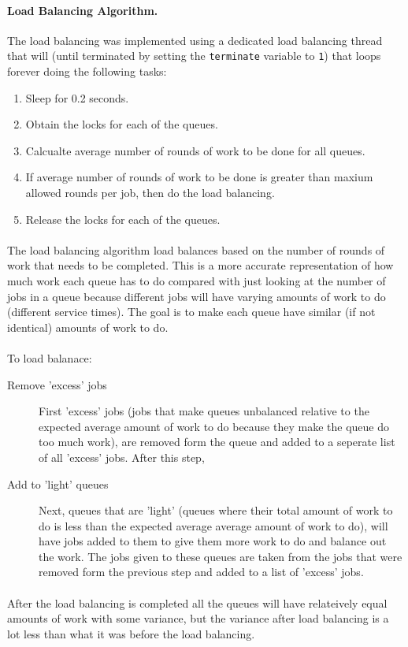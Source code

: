 \documentclass[12pt]{article}
\begin{document}
\paragraph{Load Balancing Algorithm.} The load balancing was implemented using a dedicated load balancing thread that will (until terminated by setting the {\tt terminate} variable to {\tt 1}) that loops forever doing the following tasks:
\begin{enumerate}
  \item Sleep for 0.2 seconds.
  \item Obtain the locks for each of the queues.
  \item Calcualte average number of rounds of work to be done for all queues.
  \item If average number of rounds of work to be done is greater than maxium allowed rounds per job, then do the load balancing.
  \item Release the locks for each of the queues.
\end{enumerate}

\paragraph{} The load balancing algorithm load balances based on the number of rounds of work that needs to be completed. This is a more accurate representation of how much work each queue has to do compared with just looking at the number of jobs in a queue because different jobs will have varying amounts of work to do (different service times). The goal is to make each queue have similar (if not identical) amounts of work to do.

\paragraph{} To load balanace:
\begin{description}
  \item [Remove 'excess' jobs] First 'excess' jobs (jobs that make queues unbalanced relative to the expected average amount of work to do because they make the queue do too much work), are removed form the queue and added to a seperate list of all 'excess' jobs. After this step,
  \item [Add to 'light' queues] Next, queues that are 'light' (queues where their total amount of work to do is less than the expected average average amount of work to do), will have jobs added to them to give them more work to do and balance out the work. The jobs given to these queues are taken from the jobs that were removed form the previous step and added to a list of 'excess' jobs.
\end{description}
\paragraph{} After the load balancing is completed all the queues will have relateively equal amounts of work with some variance, but the variance after load balancing is a lot less than what it was before the load balancing.
\end{document}
